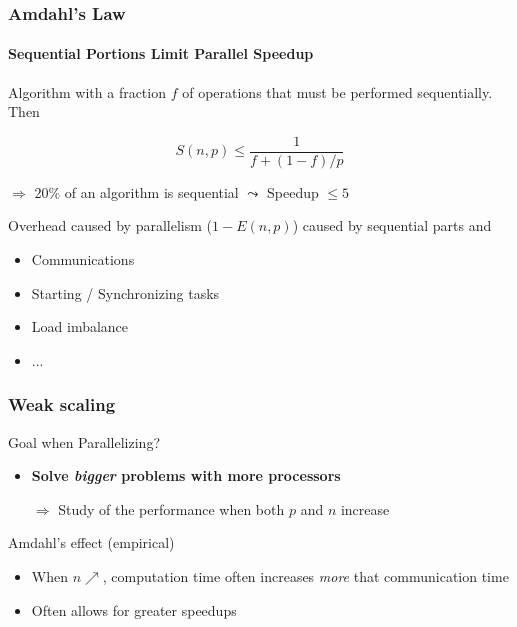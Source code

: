 \documentclass[xcolor={x11names,svgnames,psnames}]{beamer}
\begin{document}

\begin{frame}
  \frametitle{Amdahl's Law}
  \framesubtitle{Sequential Portions Limit Parallel Speedup}

  Algorithm with a fraction $f$ of operations that must be performed
  sequentially. Then

\[
  S(n,p)  \leq  \frac{1}{f + (1 - f)/p}
\]

$\Rightarrow$ 20\% of an algorithm is sequential $\leadsto$ Speedup $\leq 5$

\bigskip

Overhead caused by parallelism ($1 - E(n,p)$) 
caused by sequential parts and
\begin{itemize}
\item Communications
\item Starting / Synchronizing tasks 
\item Load imbalance
\item ...
\end{itemize}

\end{frame}

\begin{frame}
\frametitle{Weak scaling}

\begin{alertblock}{Goal when Parallelizing?}
  \begin{itemize}
  \item \textbf{Solve \emph{bigger} problems with more processors}
  \item[$\Rightarrow$] Study of the performance when both $p$ and $n$ increase
  \end{itemize}
\end{alertblock}

\medskip

\begin{exampleblock}{Amdahl's effect (empirical)}
\begin{itemize}
\item When $n \nearrow$, computation time often increases \emph{more} that communication time
\item Often allows for greater speedups
\end{itemize}
\end{exampleblock}
\end{frame}

\end{document}
